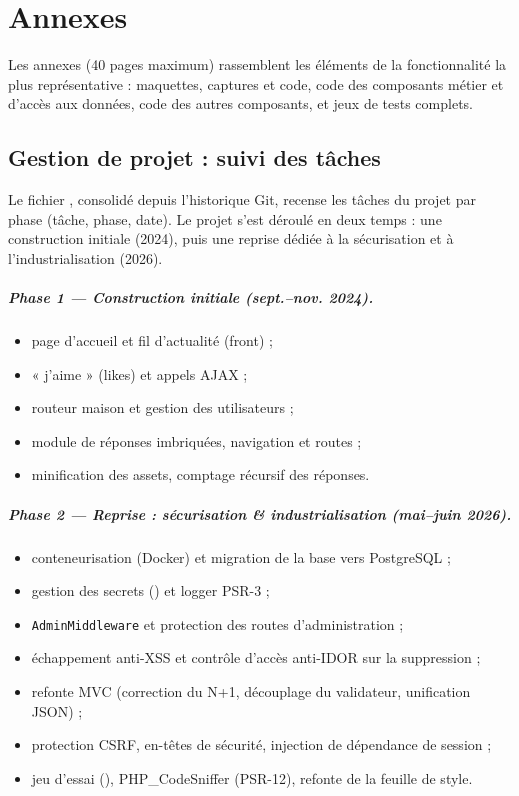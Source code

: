 \chapter{Annexes}
\label{ch:annexes}

Les annexes (40 pages maximum) rassemblent les éléments de la fonctionnalité la plus
représentative : maquettes, captures et code, code des composants métier et d'accès aux données,
code des autres composants, et jeux de tests complets.

\section{Gestion de projet : suivi des tâches}
\label{ann:gestion}

Le fichier , consolidé depuis l'historique Git, recense les tâches du projet par
phase (tâche, phase, date). Le projet s'est déroulé en deux temps : une construction initiale
(2024), puis une reprise dédiée à la sécurisation et à l'industrialisation (2026).

\paragraph{Phase 1 — Construction initiale (sept.–nov. 2024).}
\begin{itemize}\setlength{\itemsep}{0pt}
  \item page d'accueil et fil d'actualité (front) ;
  \item « j'aime » (likes) et appels AJAX ;
  \item routeur maison et gestion des utilisateurs ;
  \item module de réponses imbriquées, navigation et routes ;
  \item minification des assets, comptage récursif des réponses.
\end{itemize}

\paragraph{Phase 2 — Reprise : sécurisation \& industrialisation (mai–juin 2026).}
\begin{itemize}\setlength{\itemsep}{0pt}
  \item conteneurisation (Docker) et migration de la base vers PostgreSQL ;
  \item gestion des secrets () et logger PSR-3 ;
  \item \texttt{AdminMiddleware} et protection des routes d'administration ;
  \item échappement anti-XSS et contrôle d'accès anti-IDOR sur la suppression ;
  \item refonte MVC (correction du N+1, découplage du validateur, unification JSON) ;
  \item protection CSRF, en-têtes de sécurité, injection de dépendance de session ;
  \item jeu d'essai (), PHP\_CodeSniffer (PSR-12), refonte de la feuille de style.
\end{itemize}

